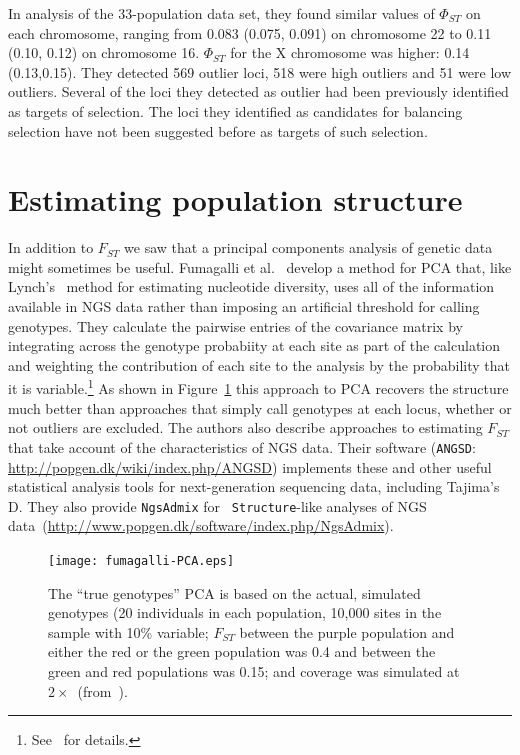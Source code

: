 In analysis of the 33-population data set, they found similar values
of $\Phi_{ST}$ on each chromosome, ranging from 0.083 (0.075, 0.091)
on chromosome 22 to 0.11 (0.10, 0.12) on chromosome 16. $\Phi_{ST}$
for the X chromosome was higher: 0.14 (0.13,0.15). They detected 569
outlier loci, 518 were high outliers and 51 were low outliers. Several
of the loci they detected as outlier had been previously identified as
targets of selection. The loci they identified as candidates for
balancing selection have not been suggested before as targets of such
selection.  

\section*{Estimating population structure}

In addition to $F_{ST}$ we saw that a principal components analysis of
genetic data might sometimes be useful. Fumagalli et
al.~\cite{Fumagalli-etal-2013} develop a method for PCA that, like
Lynch's~\cite{Lynch-2008} method for estimating nucleotide diversity,
uses all of the information available in NGS data rather than imposing
an artificial threshold for calling genotypes. They calculate the
pairwise entries of the covariance matrix by integrating across the
genotype probabiity at each site as part of the calculation and
weighting the contribution of each site to the analysis by the
probability that it is
variable.\footnote{See~\cite{Fumagalli-etal-2013} for details.} As
shown in Figure~\ref{fig:Fumagalli-PCA} this approach to PCA recovers
the structure much better than approaches that simply call genotypes
at each locus, whether or not outliers are excluded. The authors also
describe approaches to estimating $F_{ST}$ that take account of the
characteristics of NGS data. Their software ({\tt ANGSD}:
\url{http://popgen.dk/wiki/index.php/ANGSD}) implements these and
other useful statistical analysis tools for next-generation sequencing
data, including Tajima's D. They also provide {\tt NgsAdmix} for {\tt
  Structure}-like analyses of NGS
data~(\url{http://www.popgen.dk/software/index.php/NgsAdmix}). 

\begin{figure}
\begin{center}
\texttt{[image: fumagalli-PCA.eps]}
\caption{The ``true genotypes'' PCA is based on the actual, simulated
  genotypes (20 individuals in each population, 10,000 sites in the
  sample with 10\% variable; $F_{ST}$ between the purple population
  and either the red or the green population was 0.4 and between the
  green and red populations was 0.15; and coverage was simulated at
  $2\times$~(from~\cite{Fumagalli-etal-2013}).}\label{fig:Fumagalli-PCA}
\end{center}

\end{figure}

